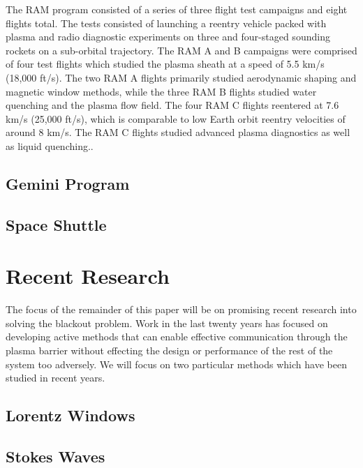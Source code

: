 \documentclass[twocolumn]{article}
\begin{document}
	The RAM program consisted of a series of three flight test campaigns and eight flights total.
	The tests consisted of launching a reentry vehicle packed with plasma and radio diagnostic experiments on three and four-staged sounding rockets on a sub-orbital trajectory.
	The RAM A and B campaigns were comprised of four test flights which studied the plasma sheath at a speed of 5.5 km/s (18,000 ft/s).\cite{huber_entry_1971}
	The two RAM A flights primarily studied aerodynamic shaping and magnetic window methods, while the three RAM B flights studied water quenching and the plasma flow field.
	The four RAM C flights reentered at 7.6 km/s (25,000 ft/s), which is comparable to low Earth orbit reentry velocities of around 8 km/s.
	The RAM C flights studied advanced plasma diagnostics as well as liquid quenching.\cite{huber_entry_1971}.
	
	\subsection*{Gemini Program}
	
	\subsection*{Space Shuttle}

\section{Recent Research} \label{sec:Solutions}
	The focus of the remainder of this paper will be on promising recent research into solving the blackout problem.
	Work in the last twenty years has focused on developing active methods that can enable effective communication through the plasma barrier without effecting the design or performance of the rest of the system too adversely.
	We will focus on two particular methods which have been studied in recent years.
	
\subsection*{Lorentz Windows}
\subsection*{Stokes Waves}



\end{document}
